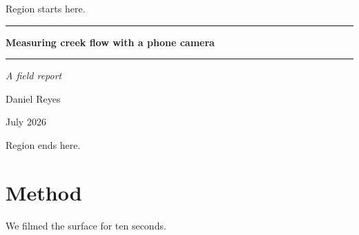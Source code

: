 \documentclass[11pt]{report}
\begin{document}
Region starts here.

\begin{titlepage}
\centering
\vspace*{25mm}
\rule{\linewidth}{0.8pt}\par
\vspace{4mm}
{\LARGE\bfseries Measuring creek flow with a phone camera\par}
\vspace{4mm}
\rule{\linewidth}{0.8pt}\par
\vspace{15mm}
{\large\itshape A field report\par}
\vspace{10mm}
{\Large Daniel Reyes\par}
\vfill
{\large July 2026\par}
\end{titlepage}

Region ends here.

\chapter{Method}
We filmed the surface for ten seconds.
\end{document}
